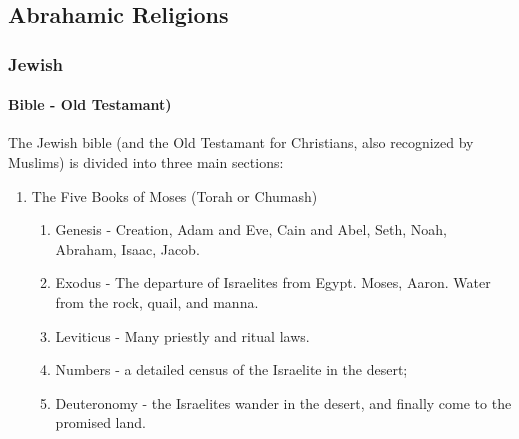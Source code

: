 		\subsection{Abrahamic Religions}
			\subsubsection{Jewish}
				\paragraph{Bible - Old Testamant)} \label{Old Testamant}
				The Jewish bible (and the Old Testamant for Christians, also recognized by Muslims) is divided into three main sections:
				\begin{enumerate}
					\item The Five Books of Moses (Torah or Chumash)
					\begin{enumerate}
						\item Genesis - Creation, Adam and Eve, Cain and Abel, Seth, Noah, Abraham, Isaac, Jacob.  
						\item Exodus - The departure of Israelites from Egypt.  Moses, Aaron.  Water from the rock, quail, and manna.
						\item Leviticus - Many priestly and ritual laws. 
						\item Numbers - a detailed census of the Israelite in the desert; 
						\item Deuteronomy - the Israelites wander in the desert, and finally come to the promised land.
						

\end{enumerate}
\end{enumerate}
